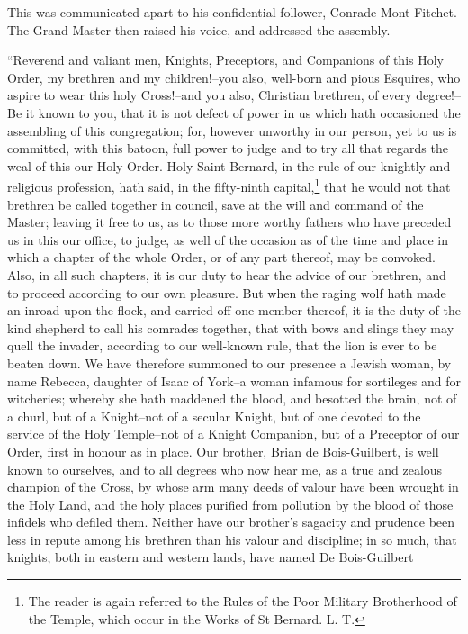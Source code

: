 This was communicated apart to his confidential follower, Conrade
Mont-Fitchet. The Grand Master then raised his voice, and addressed the
assembly.

``Reverend and valiant men, Knights, Preceptors, and Companions of this
Holy Order, my brethren and my children!--you also, well-born and pious
Esquires, who aspire to wear this holy Cross!--and you also, Christian
brethren, of every degree!--Be it known to you, that it is not defect of
power in us which hath occasioned the assembling of this congregation;
for, however unworthy in our person, yet to us is committed, with this
batoon, full power to judge and to try all that regards the weal of this
our Holy Order. Holy Saint Bernard, in the rule of our knightly and
religious profession, hath said, in the fifty-ninth
capital,\footnote{The reader is again referred to the Rules of the Poor
Military Brotherhood of the Temple, which occur in the Works of St
Bernard. L. T.}
that he would not that brethren be called together in council, save at
the will and command of the Master; leaving it free to us, as to those
more worthy fathers who have preceded us in this our office, to judge,
as well of the occasion as of the time and place in which a chapter of
the whole Order, or of any part thereof, may be convoked. Also, in all
such chapters, it is our duty to hear the advice of our brethren, and to
proceed according to our own pleasure. But when the raging wolf hath
made an inroad upon the flock, and carried off one member thereof, it is
the duty of the kind shepherd to call his comrades together, that with
bows and slings they may quell the invader, according to our well-known
rule, that the lion is ever to be beaten down. We have therefore
summoned to our presence a Jewish woman, by name Rebecca, daughter of
Isaac of York--a woman infamous for sortileges and for witcheries;
whereby she hath maddened the blood, and besotted the brain, not of a
churl, but of a Knight--not of a secular Knight, but of one devoted to
the service of the Holy Temple--not of a Knight Companion, but of a
Preceptor of our Order, first in honour as in place. Our brother, Brian
de Bois-Guilbert, is well known to ourselves, and to all degrees who now
hear me, as a true and zealous champion of the Cross, by whose arm many
deeds of valour have been wrought in the Holy Land, and the holy places
purified from pollution by the blood of those infidels who defiled them.
Neither have our brother's sagacity and prudence been less in repute
among his brethren than his valour and discipline; in so much, that
knights, both in eastern and western lands, have named De Bois-Guilbert
